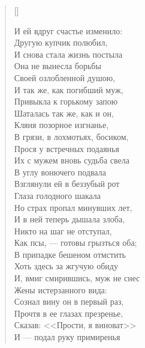 \begin{verse}[\versewidth]
\begin{patverse*}
И ей вдруг счастье изменило:\\
Другую купчик полюбил,\\
И снова стала жизнь постыла\ldotst\\
Она не вынесла борьбы\\
Своей озлобленной душою,\\
И так же, как погибший муж,\\
Привыкла к горькому запою\ldotst\\
Шаталась так же, как и он,\\
Кляня позорное изгнанье,\\
В грязи, в лохмотьях, босиком,\\
Прося у встречных подаянья\ldotst\\
Их с мужем вновь судьба свела\\
В углу вонючего подвала\ldotse\\
Взглянули ей в беззубый рот\\
Глаза голодного шакала\ldotst\\
Но страх пропал минувших лет,\\
И в ней теперь дышала злоба,\\
Никто на шаг не отступал,\\
Как псы, --- готовы грызться оба;\\
В припадке бешеном отмстить\\
Хоть здесь за жгучую обиду\ldotst\\
И, вмиг смирившись, муж не снес\\
Жены истерзанного вида:\\
Сознал вину он в первый раз,\\
Прочтя в ее глазах презренье,\\
Сказав: <<Прости, я виноват>>\ldotst\\
И --- подал руку примиренья\ldotst
\end{patverse*}
\end{verse}

\newpage
\vspace*{0cm}


